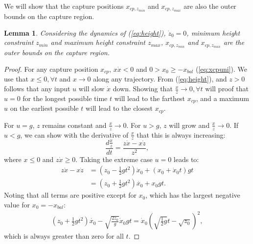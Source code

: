 \documentclass[letterpaper, 10 pt, conference]{ieeeconf}  %
\newcommand{\zmin}{z_{min}}
\newcommand{\zmax}{z_{max}}
\newtheorem{lem}{Lemma}
\begin{document}
We will show that the capture positions $x_{cp,\zmin}$ and $x_{cp,\zmax}$ are also the outer bounds on the capture region.

\begin{lem}\label{lem:regionz}
Considering the dynamics of (\ref{eq:height}), $\dot{z}_0=0$, minimum height constraint $\zmin$ and maximum height constraint $\zmax$, $x_{cp,\zmin}$ and $x_{cp,\zmax}$ are the outer bounds on the capture region.
\end{lem}
\begin{proof}
For any capture position $x_{cp}$, $x\dot{x}<0$ \cite{koolen2016balance} and $0>x_0\geq-x_{bal}$ (\ref{eq:xcpuni}). 
We use that $x \leq 0, \forall t$ and $x\rightarrow 0$ along any trajectory. From (\ref{eq:height}), and $z>0$ follows that any input $u$ will slow $\dot{x}$ down. Showing that $\frac{x}{z}\rightarrow 0, \forall t$ will proof that $u=0$ for the longest possible time $t$ will lead to the farthest $x_{cp}$, and a maximum $u$ on the earliest possible $t$ will lead to the closest $x_{cp}$. 

For $u=g$, $z$ remains constant and $\frac{x}{z}\rightarrow 0$. For $u>g$, $z$ will grow and $\frac{x}{z}\rightarrow 0$. If $u<g$, we can show with the derivative of $\frac{x}{z}$ that this is always increasing:
\begin{equation}
\frac{d\frac{x}{z}}{dt}= \frac{z\dot{x}-x\dot{z}}{z^2},
\end{equation}
where $x \leq 0$ and $z \dot{x} \geq 0$. Taking the extreme case $u=0$ leads to:
\begin{align}
	z\dot{x}-x\dot{z} &= (z_0 - \frac{1}{2}gt^2)\dot{x}_0 + (x_0 + \dot{x}_0 t)gt\\
	&= (z_0 +\frac{1}{2}gt^2)\dot{x_0} + x_0gt.
\end{align}
Noting that all terms are positive except for $x_0$, which has the largest negative value for $x_0=-x_{bal}$:
\begin{align}
	(z_0 +\frac{1}{2}gt^2)\dot{x_0} - \sqrt{\frac{2z_0}{g}}\dot{x}_0gt = \dot{x}_0(\sqrt{\frac{1}{2}g}t - \sqrt{z_0})^2,
\end{align}
which is always greater than zero for all $t$.
\end{proof}
\end{document}
